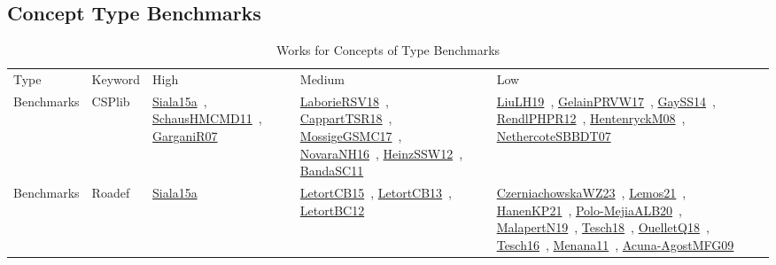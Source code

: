 \clearpage
\subsection{Concept Type Benchmarks}
\label{sec:Benchmarks}
{\scriptsize
\begin{longtable}{lp{3cm}>{\raggedright\arraybackslash}p{6cm}>{\raggedright\arraybackslash}p{6cm}>{\raggedright\arraybackslash}p{8cm}}
\rowcolor{white}\caption{Works for Concepts of Type Benchmarks}\\ \toprule
\rowcolor{white}Type & Keyword & High & Medium & Low\\ \midrule\endhead
\bottomrule
\endfoot
Benchmarks & CSPlib & \href{works/Siala15a.pdf}{Siala15a}~\cite{Siala15a}, \href{works/SchausHMCMD11.pdf}{SchausHMCMD11}~\cite{SchausHMCMD11}, \href{works/GarganiR07.pdf}{GarganiR07}~\cite{GarganiR07} & \href{works/LaborieRSV18.pdf}{LaborieRSV18}~\cite{LaborieRSV18}, \href{works/CappartTSR18.pdf}{CappartTSR18}~\cite{CappartTSR18}, \href{works/MossigeGSMC17.pdf}{MossigeGSMC17}~\cite{MossigeGSMC17}, \href{works/NovaraNH16.pdf}{NovaraNH16}~\cite{NovaraNH16}, \href{works/HeinzSSW12.pdf}{HeinzSSW12}~\cite{HeinzSSW12}, \href{works/BandaSC11.pdf}{BandaSC11}~\cite{BandaSC11} & \href{works/LiuLH19.pdf}{LiuLH19}~\cite{LiuLH19}, \href{works/GelainPRVW17.pdf}{GelainPRVW17}~\cite{GelainPRVW17}, \href{works/GaySS14.pdf}{GaySS14}~\cite{GaySS14}, \href{works/RendlPHPR12.pdf}{RendlPHPR12}~\cite{RendlPHPR12}, \href{works/HentenryckM08.pdf}{HentenryckM08}~\cite{HentenryckM08}, \href{works/NethercoteSBBDT07.pdf}{NethercoteSBBDT07}~\cite{NethercoteSBBDT07}\\
Benchmarks & Roadef & \href{works/Siala15a.pdf}{Siala15a}~\cite{Siala15a} & \href{works/LetortCB15.pdf}{LetortCB15}~\cite{LetortCB15}, \href{works/LetortCB13.pdf}{LetortCB13}~\cite{LetortCB13}, \href{works/LetortBC12.pdf}{LetortBC12}~\cite{LetortBC12} & \href{works/CzerniachowskaWZ23.pdf}{CzerniachowskaWZ23}~\cite{CzerniachowskaWZ23}, \href{works/Lemos21.pdf}{Lemos21}~\cite{Lemos21}, \href{works/HanenKP21.pdf}{HanenKP21}~\cite{HanenKP21}, \href{works/Polo-MejiaALB20.pdf}{Polo-MejiaALB20}~\cite{Polo-MejiaALB20}, \href{works/MalapertN19.pdf}{MalapertN19}~\cite{MalapertN19}, \href{works/Tesch18.pdf}{Tesch18}~\cite{Tesch18}, \href{works/OuelletQ18.pdf}{OuelletQ18}~\cite{OuelletQ18}, \href{works/Tesch16.pdf}{Tesch16}~\cite{Tesch16}, \href{works/Menana11.pdf}{Menana11}~\cite{Menana11}, \href{works/Acuna-AgostMFG09.pdf}{Acuna-AgostMFG09}~\cite{Acuna-AgostMFG09}\\

\end{longtable}}

